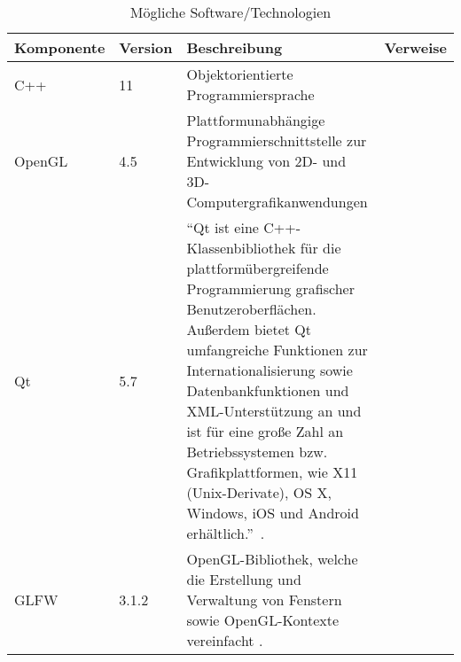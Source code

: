 \begin{longtabu}{p{0.2\textwidth}p{0.1\textwidth}p{0.6\textwidth}p{0.1\textwidth}}
    \caption{Mögliche
        Software/Technologien}\label{table:requirements:additional-requirements:software}\\
    \toprule
    \textbf{Komponente} & \textbf{Version} & \textbf{Beschreibung} & \textbf{Verweise} \\
    \midrule
    C++        & 11      & Objektorientierte Programmiersprache
                           & \protect\footnotemark{}\\

    OpenGL     & 4.5     & Plattformunabhängige Programmierschnittstelle zur
                           Entwicklung von 2D- und 3D-Computergrafikanwendungen
                           \parencite{wikipedia_the_free_encyclopedia_opengl_2015}
                           &\protect\footnotemark{}\\

    Qt        & 5.7      & ``Qt ist eine C++-Klassenbibliothek für die
                           plattformübergreifende Programmierung grafischer
                           Benutzeroberflächen. Außerdem bietet Qt
                           umfangreiche Funktionen zur Internationalisierung
                           sowie Datenbankfunktionen und XML-Unterstützung an
                           und ist für eine große Zahl an Betriebssystemen bzw.
                           Grafikplattformen, wie X11 (Unix-Derivate), OS X,
                           Windows, iOS und Android
                           erhältlich.''~\parencite{wikipedia_foundation_qt_2016}.
                           &\protect\footnotemark{}\\

    GLFW       & 3.1.2   & OpenGL-Bibliothek, welche die Erstellung und
                           Verwaltung von Fenstern sowie OpenGL-Kontexte
                           vereinfacht
                           \parencite{wikipedia_the_free_encyclopedia_glfw_2015}.
                           &\protect\footnotemark{}\\


\end{longtabu}
